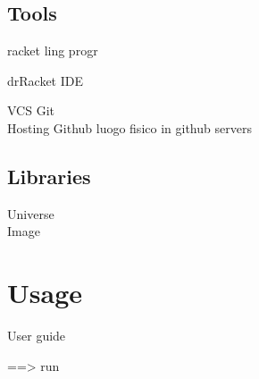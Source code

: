 \documentclass{article}
\begin{document}
 \subsection{Tools}
 
 racket ling progr
 
 drRacket IDE
 
 
 VCS Git \\
 
 
Hosting Github
luogo fisico in github servers

\subsection{Libraries}
Universe \\
Image

 \section{Usage}
 User guide
 
 ==> run

\end{document}
